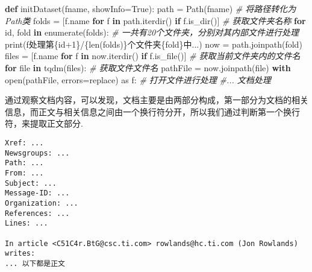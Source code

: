 \documentclass[
]{article}
\newenvironment{Shaded}{}{}
\newcommand{\BuiltInTok}[1]{#1}
\newcommand{\CommentTok}[1]{\textcolor[rgb]{0.38,0.63,0.69}{\textit{#1}}}
\newcommand{\ControlFlowTok}[1]{\textcolor[rgb]{0.00,0.44,0.13}{\textbf{#1}}}
\newcommand{\DecValTok}[1]{\textcolor[rgb]{0.25,0.63,0.44}{#1}}
\newcommand{\ImportTok}[1]{#1}
\newcommand{\KeywordTok}[1]{\textcolor[rgb]{0.00,0.44,0.13}{\textbf{#1}}}
\newcommand{\NormalTok}[1]{#1}
\newcommand{\OperatorTok}[1]{\textcolor[rgb]{0.40,0.40,0.40}{#1}}
\newcommand{\SpecialCharTok}[1]{\textcolor[rgb]{0.25,0.44,0.63}{#1}}
\newcommand{\SpecialStringTok}[1]{\textcolor[rgb]{0.73,0.40,0.53}{#1}}
\newcommand{\StringTok}[1]{\textcolor[rgb]{0.25,0.44,0.63}{#1}}
\newcommand{\VariableTok}[1]{\textcolor[rgb]{0.10,0.09,0.49}{#1}}
\begin{document}
\begin{Shaded}
\begin{Highlighting}[]
\KeywordTok{def}\NormalTok{ initDataset(fname, showInfo}\OperatorTok{=}\VariableTok{True}\NormalTok{):}
\NormalTok{    path }\OperatorTok{=}\NormalTok{ Path(fname)  }\CommentTok{\# 将路径转化为Path类}
\NormalTok{    folds }\OperatorTok{=}\NormalTok{ [f.name }\ControlFlowTok{for}\NormalTok{ f }\KeywordTok{in}\NormalTok{ path.iterdir() }\ControlFlowTok{if}\NormalTok{ f.is\_dir()]  }\CommentTok{\# 获取文件夹名称}
    \ControlFlowTok{for} \BuiltInTok{id}\NormalTok{, fold }\KeywordTok{in} \BuiltInTok{enumerate}\NormalTok{(folds):  }\CommentTok{\# 一共有20个文件夹，分别对其内部文件进行处理}
        \BuiltInTok{print}\NormalTok{(}\SpecialStringTok{f\textquotesingle{}处理第}\SpecialCharTok{\{}\BuiltInTok{id}\OperatorTok{+}\DecValTok{1}\SpecialCharTok{\}}\SpecialStringTok{/}\SpecialCharTok{\{}\BuiltInTok{len}\NormalTok{(folds)}\SpecialCharTok{\}}\SpecialStringTok{个文件夹}\SpecialCharTok{\{}\NormalTok{fold}\SpecialCharTok{\}}\SpecialStringTok{中...\textquotesingle{}}\NormalTok{)}
\NormalTok{        now }\OperatorTok{=}\NormalTok{ path.joinpath(fold)}
\NormalTok{        files }\OperatorTok{=}\NormalTok{ [f.name }\ControlFlowTok{for}\NormalTok{ f }\KeywordTok{in}\NormalTok{ now.iterdir() }\ControlFlowTok{if}\NormalTok{ f.is\_file()]  }\CommentTok{\# 获取当前文件夹内的文件名}
        \ControlFlowTok{for} \BuiltInTok{file} \KeywordTok{in}\NormalTok{ tqdm(files):  }\CommentTok{\# 获取文件文件名}
\NormalTok{            pathFile }\OperatorTok{=}\NormalTok{ now.joinpath(}\BuiltInTok{file}\NormalTok{)}
            \ControlFlowTok{with} \BuiltInTok{open}\NormalTok{(pathFile, errors}\OperatorTok{=}\StringTok{\textquotesingle{}replace\textquotesingle{}}\NormalTok{) }\ImportTok{as}\NormalTok{ f:  }\CommentTok{\# 打开文件进行处理}
       		\CommentTok{\#... 文档处理}
\end{Highlighting}
\end{Shaded}

通过观察文档内容，可以发现，文档主要是由两部分构成，第一部分为文档的相关信息，而正文与相关信息之间由一个换行符分开，所以我们通过判断第一个换行符，来提取正文部分.

\begin{verbatim}
Xref: ...
Newsgroups: ...
Path: ...
From: ...
Subject: ...
Message-ID: ...
Organization: ...
References: ...
Lines: ...

In article <C51C4r.BtG@csc.ti.com> rowlands@hc.ti.com (Jon Rowlands) writes:
... 以下都是正文
\end{verbatim}
\end{document}
